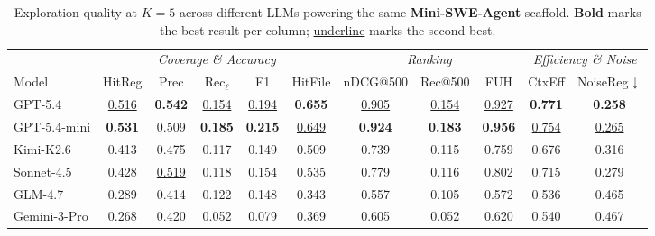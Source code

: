 %
\begin{table}[t]
  \centering
  \caption{Exploration quality at $K{=}5$ across different LLMs powering the same \textbf{Mini-SWE-Agent} scaffold. \textbf{Bold} marks the best result per column; \underline{underline} marks the second best.}
  \label{tab:llm-comparison}
  \vspace{1mm}
  \scriptsize
  \renewcommand{\arraystretch}{1.15}
  \begin{tabular*}{\textwidth}{@{\extracolsep{\fill}} l cccc c ccc cc @{}}
    \toprule
    & \multicolumn{5}{c}{\textit{Coverage \& Accuracy}} & \multicolumn{3}{c}{\textit{Ranking}} & \multicolumn{2}{c}{\textit{Efficiency \& Noise}} \\
    \cmidrule(lr){2-6} \cmidrule(lr){7-9} \cmidrule(lr){10-11}
    Model
      & HitReg & Prec & Rec$_\ell$ & F1 & HitFile
      & nDCG@500 & Rec@500 & FUH
      & CtxEff & NoiseReg$\downarrow$ \\
    \midrule
    GPT-5.4
      & \underline{0.516} & \textbf{0.542} & \underline{0.154} & \underline{0.194} & \textbf{0.655}
      & \underline{0.905} & \underline{0.154} & \underline{0.927}
      & \textbf{0.771} & \textbf{0.258} \\
    GPT-5.4-mini
      & \textbf{0.531} & 0.509 & \textbf{0.185} & \textbf{0.215} & \underline{0.649}
      & \textbf{0.924} & \textbf{0.183} & \textbf{0.956}
      & \underline{0.754} & \underline{0.265} \\
    Kimi-K2.6
      & 0.413 & 0.475 & 0.117 & 0.149 & 0.509
      & 0.739 & 0.115 & 0.759
      & 0.676 & 0.316 \\
    Sonnet-4.5
      & 0.428 & \underline{0.519} & {0.118} & 0.154 & 0.535
      & 0.779 & 0.116 & 0.802
      & 0.715 & 0.279 \\
    GLM-4.7
      & 0.289 & 0.414 & 0.122 & 0.148 & 0.343 & 0.557 & 0.105 & 0.572 & 0.536 & 0.465 \\
    Gemini-3-Pro
      & 0.268 & 0.420 & 0.052 & 0.079 & 0.369 & 0.605 & 0.052 & 0.620 & 0.540 & 0.467 \\
    \bottomrule
  \end{tabular*}
  \vspace{-4mm}
\end{table}
